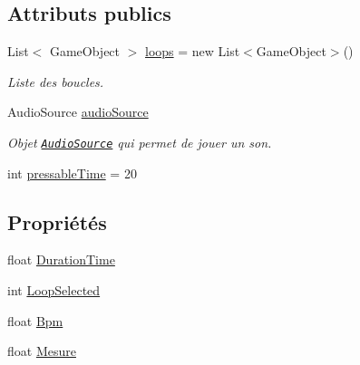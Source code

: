 \subsection*{Attributs publics}
\begin{DoxyCompactItemize}
\item 
List$<$ Game\+Object $>$ \hyperlink{class_music_ac34fdcf5a15ce705117105b68a72974d}{loops} = new List$<$Game\+Object$>$()
\begin{DoxyCompactList}\small\item\em Liste des boucles. \end{DoxyCompactList}\item 
Audio\+Source \hyperlink{class_music_ad7980e82c9bb7fc27ce15affbc4ef267}{audio\+Source}
\begin{DoxyCompactList}\small\item\em Objet \href{http://docs.unity3d.com/ScriptReference/AudioSource.html}{\tt Audio\+Source} qui permet de jouer un son. \end{DoxyCompactList}\item 
int \hyperlink{class_music_a2c0e87848bf12c5f29e62f22556f0bb0}{pressable\+Time} = 20
\end{DoxyCompactItemize}
\subsection*{Propriétés}
\begin{DoxyCompactItemize}
\item 
float \hyperlink{class_music_a20bb244d5d40d5848201077b577b0111}{Duration\+Time}
\item 
int \hyperlink{class_music_a08b2e446def0d17e713d4f723811b3be}{Loop\+Selected}
\item 
float \hyperlink{class_music_a215cbe531ec3578d7c5a06305b7e7873}{Bpm}
\item 
float \hyperlink{class_music_a84523fd3eb5ec2fa076d69dd0fd18373}{Mesure}
\end{DoxyCompactItemize}
